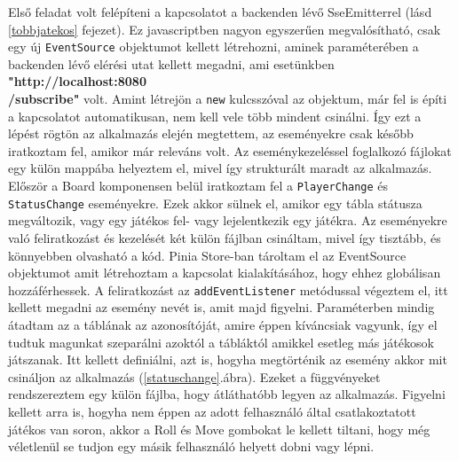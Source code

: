 \documentclass[a4paper,twoside]{article}
\begin{document}
Első feladat volt felépíteni a kapcsolatot a backenden lévő SseEmitterrel (lásd \ref{tobbjatekos} fejezet). Ez javascriptben nagyon egyszerűen megvalósítható, csak egy új \verb|EventSource| objektumot kellett létrehozni, aminek paraméterében a backenden lévő elérési utat kellett megadni, ami esetünkben \textbf{"http://localhost:8080\\/subscribe"} volt. Amint létrejön a \verb|new| kulcsszóval az objektum, már fel is építi a kapcsolatot automatikusan, nem kell vele több mindent csinálni. Így ezt a lépést rögtön az alkalmazás elején megtettem, az eseményekre csak később iratkoztam fel, amikor már releváns volt. Az eseménykezeléssel foglalkozó fájlokat egy külön mappába helyeztem el, mivel így strukturált maradt az alkalmazás.
Először a Board komponensen belül iratkoztam fel a \verb|PlayerChange| és \verb|StatusChange| eseményekre. Ezek akkor sülnek el, amikor egy tábla státusza megváltozik, vagy egy játékos fel- vagy lejelentkezik egy játékra. Az eseményekre való feliratkozást és kezelését két külön fájlban csináltam, mivel így tisztább, és könnyebben olvasható a kód. Pinia Store-ban tároltam el az EventSource objektumot amit létrehoztam a kapcsolat kialakításához, hogy ehhez globálisan hozzáférhessek. A feliratkozást az \verb|addEventListener| metódussal végeztem el, itt kellett megadni az esemény nevét is, amit majd figyelni. Paraméterben mindig átadtam az a táblának az azonosítóját, amire éppen kíváncsiak vagyunk, így el tudtuk magunkat szeparálni azoktól a tábláktól amikkel esetleg más játékosok játszanak. Itt kellett definiálni, azt is, hogyha megtörténik az esemény akkor mit csináljon az alkalmazás (\ref{statuschange}.ábra). Ezeket a függvényeket rendszereztem egy külön fájlba, hogy átláthatóbb legyen az alkalmazás. Figyelni kellett arra is, hogyha nem éppen az adott felhasználó által csatlakoztatott játékos van soron, akkor a Roll és Move gombokat le kellett tiltani, hogy még véletlenül se tudjon egy másik felhasználó helyett dobni vagy lépni. 
\end{document}
